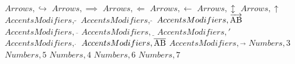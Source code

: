 \documentclass{article}
\begin{document}
\linebreak
\linebreak
$Arrows,\hookrightarrow$
\linebreak
\linebreak
$Arrows,\implies$
\linebreak
\linebreak
$Arrows,\Longleftarrow$
\linebreak
\linebreak
$Arrows,\longleftarrow$
\linebreak
\linebreak
$Arrows,\updownarrow$
\linebreak
\linebreak
$Arrows,\uparrow$
\linebreak
\linebreak
$Accents Modifiers,\tilde{\;}$
\linebreak
\linebreak
$Accents Modifiers,\hat{\;}$
\linebreak
\linebreak
$Accents Modifiers,\overrightarrow{\rm AB}$
\linebreak
\linebreak
$Accents Modifiers,\overline{\;}$
\linebreak
\linebreak
$Accents Modifiers,\underline{\;}$
\linebreak
\linebreak
$Accents Modifiers,\prime$
\linebreak
\linebreak
$Accents Modifiers,\dot{\;}$
\linebreak
\linebreak
$Accents Modifiers,\overline{\rm AB}$
\linebreak
\linebreak
$Accents Modifiers,\vec{\;}$
\linebreak
\linebreak
$Numbers,3$
\linebreak
\linebreak
$Numbers,5$
\linebreak
\linebreak
$Numbers,4$
\linebreak
\linebreak
$Numbers,6$
\linebreak
\linebreak
$Numbers,7$
\linebreak
\linebreak
\end{document}
